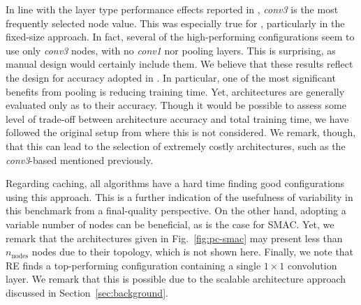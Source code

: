 In line with the layer type performance effects reported in \nasbench, \textit{conv3} is the most frequently selected node value. This was especially true for \irace, particularly in the fixed-size approach. In fact, several of the high-performing configurations 
seem to use only \textit{conv3} nodes, with no \textit{conv1} nor pooling layers. This is surprising, as manual design would certainly include them. We believe that these results reflect the design for accuracy adopted in \nasbench. In particular, one of the most significant benefits from pooling is reducing training time. Yet, architectures are generally evaluated only as to their accuracy. Though it would be possible to assess some level of trade-off between architecture accuracy and total training time, we have followed the original setup from \nasbench where this is not considered. We remark, though, that this can lead to the selection of extremely costly architectures, such as the \textit{conv3}-based mentioned previously.

Regarding caching, all algorithms have a hard time finding good configurations using this approach. This is a further indication of the usefulness of variability in this benchmark from a final-quality perspective. On the other hand, adopting a variable number of nodes can be beneficial, as is the case for SMAC. Yet, we remark that the architectures given in Fig.~\ref{fig:pc-smac} may present less than $n_\text{nodes}$ nodes due to their topology, which is not shown here. 
Finally, we note that RE finds a top-performing configuration containing a single $1 \times 1$ convolution layer. We remark that this is possible due to the scalable architecture approach discussed in Section~\ref{sec:background}.



